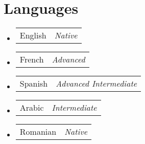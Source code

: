 \documentclass[a4paper,11pt]{article}
\makeatletter
\newcommand{\resumePOR}[3]{
\vspace{0.5mm}\item
    \begin{tabular*}{0.97\textwidth}[t]{l@{\extracolsep{\fill}}r}
        {#1}\hspace{0.3mm}#2 & \textit{\small{#3}} 
    \end{tabular*}
    \vspace{-2mm}
}
\newcommand{\resumeSubHeadingListStart}{\begin{itemize}[leftmargin=*,labelsep=0mm]}
\newcommand{\resumeSubHeadingListEnd}{\end{itemize}\vspace{2mm}}
\makeatother
\begin{document}
\section{\textbf{Languages}}
\vspace{-0.4mm}
\resumeSubHeadingListStart
\resumePOR{English} %
    {} %
    {Native} %
\resumePOR{French } %
    {} %
    {Advanced} %
\resumePOR{Spanish } %
    {} %
    {Advanced Intermediate} %
\resumePOR{Arabic } %
    {} %
    {Intermediate} %
\resumePOR{Romanian } %
    {} %
    {Native} %
\resumeSubHeadingListEnd
\vspace{-5mm}




    



\end{document}
